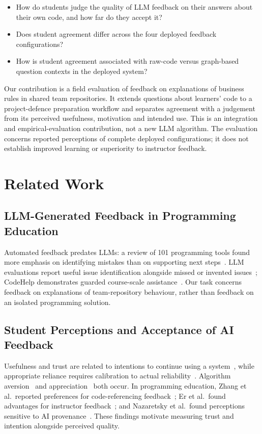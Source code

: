 \documentclass[runningheads]{llncs}
\newif\ifrqthree \rqthreetrue
\begin{document}
\begin{itemize}
  \item[\textbf{RQ1}] How do students judge the quality of LLM feedback on their answers about their own code, and how far do they accept it?
  \item[\textbf{RQ2}] Does student agreement differ across the four deployed feedback configurations?
\ifrqthree
  \item[\textbf{RQ3}] How is student agreement associated with raw-code versus graph-based question contexts in the deployed system?
\fi
\end{itemize}

Our contribution is a field evaluation of feedback on explanations of business rules in shared team repositories. It extends questions about learners' code to a project-defence preparation workflow and separates agreement with a judgement from its perceived usefulness, motivation and intended use. This is an integration and empirical-evaluation contribution, not a new LLM algorithm. The evaluation concerns reported perceptions of complete deployed configurations; it does not establish improved learning or superiority to instructor feedback.

\section{Related Work}
\label{sec:related}

\subsection{LLM-Generated Feedback in Programming Education}
Automated feedback predates LLMs: a review of 101 programming tools found more emphasis on identifying mistakes than on supporting next steps~\cite{keuning2019automated}. LLM evaluations report useful issue identification alongside missed or invented issues~\cite{hellas2023exploring,kiesler2023exploring,dai2023can}; CodeHelp demonstrates guarded course-scale assistance~\cite{liffiton2023codehelp}. Our task concerns feedback on explanations of team-repository behaviour, rather than feedback on an isolated programming solution.

\subsection{Student Perceptions and Acceptance of AI Feedback}
Usefulness and trust are related to intentions to continue using a system~\cite{davis1989perceived,venkatesh2003user}, while appropriate reliance requires calibration to actual reliability~\cite{lee2004trust}. Algorithm aversion~\cite{dietvorst2015algorithm} and appreciation~\cite{logg2019algorithm} both occur. In programming education, Zhang et al.\ reported preferences for code-referencing feedback~\cite{zhang2024students}; Er et al.\ found advantages for instructor feedback~\cite{er2025assessing}; and Nazaretsky et al.\ found perceptions sensitive to AI provenance~\cite{nazaretsky2024ai}. These findings motivate measuring trust and intention alongside perceived quality.
\end{document}
